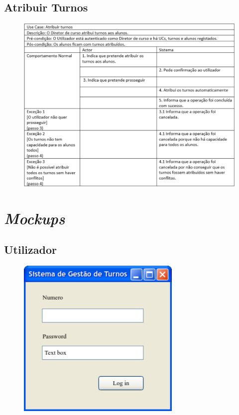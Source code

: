 \documentclass[12pt,a4paper]{report}
\begin{document}
\begin{appendices}
\section{Atribuir Turnos}
\begin{figure}[H]
	\centering 
	\includegraphics[width=\textwidth]{modelacao/especificacao_use_case/atribuirturnos.png}  
\end{figure}

\chapter{\emph{Mockups}}
\section{Utilizador}
\begin{figure}[H]
	\centering 
	\includegraphics[width=0.7\textwidth]{modelacao/mockups/login.png}  
\end{figure}


\end{appendices}
\end{document}
